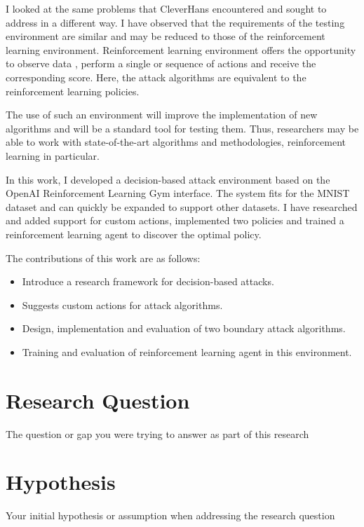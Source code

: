 \documentclass{article}
\begin{document}
I looked at the same problems that CleverHans encountered and sought to address in a different way. I have observed that the requirements of the testing environment are similar and may be reduced to those of the reinforcement learning environment.
Reinforcement learning environment offers the opportunity to observe data , perform a single or sequence of actions and receive the corresponding score. Here, the attack algorithms are equivalent to the reinforcement learning policies.

The use of such an environment will improve the implementation of new algorithms and will be a standard tool for testing them. Thus, researchers may be able to work with state-of-the-art algorithms and methodologies, reinforcement learning in particular.

In this work, I developed a decision-based attack environment based on the OpenAI Reinforcement Learning Gym \cite{brockman2016openai} interface. The system fits for the MNIST dataset \cite{mnist10027939599} and can quickly be expanded to support other datasets. I have researched and added support for custom actions, implemented two policies and trained a reinforcement learning agent to discover the optimal policy.

The contributions of this work are as follows:
\begin{itemize}
\item Introduce a research framework for decision-based attacks. 
\item Suggests custom actions for attack algorithms.
\item Design, implementation and evaluation of two boundary attack algorithms.
\item Training and evaluation of reinforcement learning agent in this environment.
\end{itemize}

\section{Research Question}

The question or gap you were trying to answer as part of this research

\section{Hypothesis}
Your initial hypothesis or assumption when addressing the research question
\end{document}
